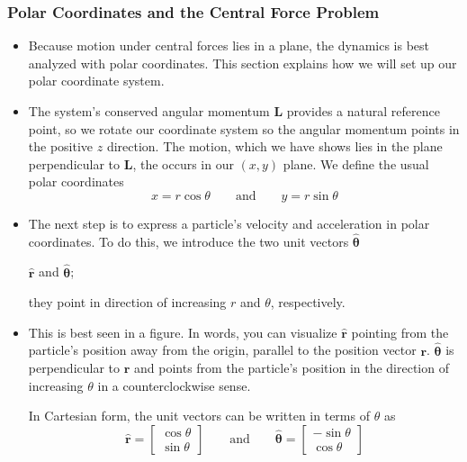 \documentclass[11pt, a4paper]{article}
\newcommand{\eqtext}[1]{\qquad \text{#1} \qquad}
\newcommand{\uvec}[1]{\bm{\hat{\mathbf{#1}}}} %
\begin{document}
\subsubsection{Polar Coordinates and the Central Force Problem}
\begin{itemize}
	\item Because motion under central forces lies in a plane, the dynamics is best analyzed with polar coordinates. This section explains how we will set up our polar coordinate system.
	
	\item The system's conserved angular momentum $ \bm{L} $ provides a natural reference point, so we rotate our coordinate system so the angular momentum points in the positive $ z $ direction. The motion, which we have shows lies in the plane perpendicular to $ \bm{L} $, the occurs in our $ (x, y) $ plane. We define the usual polar coordinates
	\begin{equation*}
		x = r \cos \theta \eqtext{and} y = r \sin \theta 
	\end{equation*}
	
	\item  The next step is to express a particle's velocity and acceleration in polar coordinates. To do this, we introduce the two unit vectors $ \uvec{\theta} $
	
	$ \uvec{r} $ and $ \uvec{\theta} $; 
		
	they point in direction of increasing $ r $ and $ \theta $, respectively.
				
	\item This is best seen in a figure. In words, you can visualize $ \uvec{r} $ pointing from the particle's position away from the origin, parallel to the position vector $ \bm{r} $. $ \uvec{\theta} $ is perpendicular to $ \uvec{r} $ and points from the particle's position in the direction of increasing $ \theta $ in a counterclockwise sense. 
	
	In Cartesian form, the unit vectors can be written in terms of $ \theta $ as
	\begin{equation*}
		\uvec{r} = 
		\begin{bmatrix}
			\cos \theta\\
			\sin \theta
		\end{bmatrix} \eqtext{and}
		\uvec{\theta} = 
		\begin{bmatrix}
 			- \sin \theta\\
 			\cos \theta
 		\end{bmatrix} 
	\end{equation*}
	

\end{itemize}
\end{document}
